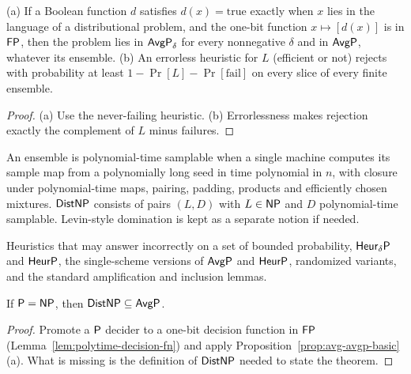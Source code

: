 \begin{proposition}
  \label{prop:avg-avgp-basic}
  \leanok
  (a) If a Boolean function $d$ satisfies $d(x) = \mathrm{true}$ exactly when
  $x$ lies in the language of a distributional problem, and the one-bit
  function $x \mapsto [d(x)]$ is in $\mathsf{FP}$, then the problem lies in
  $\mathsf{AvgP}_\delta$ for every nonnegative $\delta$ and in $\mathsf{AvgP}$, whatever
  its ensemble. (b) An errorless heuristic for $L$ (efficient or not) rejects
  with probability at least $1 - \Pr[L] - \Pr[\mathrm{fail}]$ on every slice of
  every finite ensemble.
\end{proposition}
\begin{proof}
  \leanok
  (a) Use the never-failing heuristic. (b) Errorlessness makes rejection
  exactly the complement of $L$ minus failures.
\end{proof}

\begin{definition}
  \label{def:avg-distnp}
  An ensemble is polynomial-time samplable when a single machine computes its
  sample map from a polynomially long seed in time polynomial in $n$, with
  closure under polynomial-time maps, pairing, padding, products and
  efficiently chosen mixtures. $\mathsf{DistNP}$ consists of pairs $(L, D)$ with
  $L \in \mathsf{NP}$ and $D$ polynomial-time samplable. Levin-style domination is
  kept as a separate notion if needed.
\end{definition}

\begin{definition}
  \label{def:avg-heurp}
  Heuristics that may answer incorrectly on a set of bounded probability,
  $\mathsf{Heur}_\delta\mathsf{P}$ and $\mathsf{HeurP}$, the single-scheme versions of
  $\mathsf{AvgP}$ and $\mathsf{HeurP}$, randomized variants, and the standard
  amplification and inclusion lemmas.
\end{definition}

\begin{theorem}
  \label{thm:avg-easy-direction}
  \notready
  If $\mathsf{P} = \mathsf{NP}$, then $\mathsf{DistNP} \subseteq \mathsf{AvgP}$.
\end{theorem}
\begin{proof}
  Promote a $\mathsf{P}$ decider to a one-bit decision function in $\mathsf{FP}$
  (Lemma~\ref{lem:polytime-decision-fn}) and apply Proposition~\ref{prop:avg-avgp-basic}(a). What is missing is the
  definition of $\mathsf{DistNP}$ needed to state the theorem.
\end{proof}

